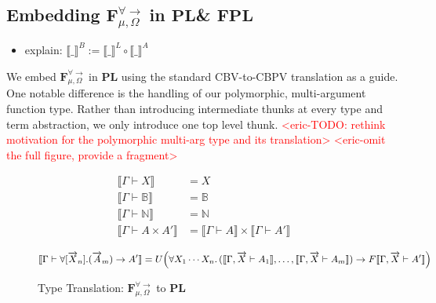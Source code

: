 \documentclass[acmsmall]{acmart}
\newcommand{\den}[1]{\llbracket #1\rrbracket}
\newcommand{\eric}[1]{\textcolor{red}{ <eric-#1> }}
\newcommand{\source}{$\mathbf{F}_{\mu,\Omega}^{\forall\to}\;$}
\newcommand{\pl}{$\mathbf{PL}$}
\newcommand{\fpl}{$\mathbf{FPL}$}
\begin{document}
\subsection{Embedding \source in \pl\;\& \fpl}\label{sec:SourceToPL}
\begin{itemize}
  \item explain: $\den{\_}^B := \den{\_}^L \circ \den{\_}^A$
\end{itemize}
We embed \source in \pl\; using the standard CBV-to-CBPV translation\cite{CBPV} as a guide. One notable difference is the handling of our polymorphic, multi-argument function type. Rather than introducing intermediate thunks at every type and term abstraction, we only introduce one top level thunk. \eric{TODO: rethink motivation for the polymorphic multi-arg type and its translation}
\eric{omit the full figure, provide a fragment}



\begin{figure}[H]
\centering
\scriptsize
\begin{align*}
\den{\Gamma \vdash X} &= X \\
\den{\Gamma \vdash \mathbb{B}} &= \mathbb{B} \\
\den{\Gamma \vdash \mathbb{N}} &= \mathbb{N} \\
\den{\Gamma \vdash A\times A'} &= \den{\Gamma \vdash A}\times \den{\Gamma \vdash A'} \\
\end{align*}
\[
\den{\Gamma \vdash \forall[\overrightarrow{X}_n].(\overrightarrow{A}_m)\to A'} 
= U\Bigl(\forall X_1\cdots X_n.\,(\den{\Gamma,\overrightarrow{X}\vdash A_1}, \ldots, \den{\Gamma,\overrightarrow{X}\vdash A_m}) \to F\den{\Gamma,\overrightarrow{X}\vdash A'}\Bigr)
\]
\caption{Type Translation: \source to \pl}
\end{figure}
\end{document}
